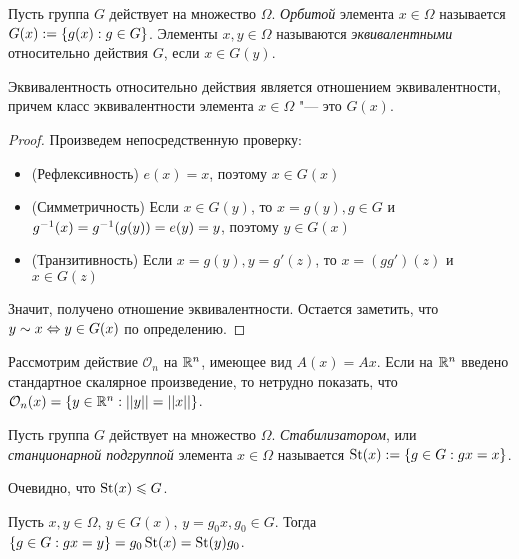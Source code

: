 \begin{definition}
	Пусть группа $G$ действует на множество $\Omega$. \textit{Орбитой} элемента $x \in \Omega$ называется $G(x) := \{g(x): g \hm\in G\}$. Элементы $x, y \in \Omega$ называются \textit{эквивалентными} относительно действия $G$, если $x \in G(y)$.
\end{definition}

\begin{proposition}
	Эквивалентность относительно действия является отношением эквивалентности, причем класс эквивалентности элемента $x \in \Omega$ "--- это $G(x)$.
\end{proposition}

\begin{proof} Произведем непосредственную проверку:
	\begin{itemize}
		\item (Рефлексивность) $e(x) = x$, поэтому $x \in G(x)$
		\item (Симметричность) Если $x \in G(y)$, то $x = g(y), g \in G$ и $g^{-1}(x) \hm= g^{-1}(g(y)) = e(y) = y$, поэтому $y \in G(x)$
		\item (Транзитивность) Если $x = g(y), y = g'(z)$, то $x = (gg')(z)$ и $x \in G(z)$
	\end{itemize}

	Значит, получено отношение эквивалентности. Остается заметить, что $y \sim x \Leftrightarrow y \hm\in G(x)$ по определению.
\end{proof}

\begin{example}
	Рассмотрим действие $\mathcal{O}_n$ на $\mathbb{R}^n$, имеющее вид $A(x) = Ax$. Если на $\mathbb{R}^n$ введено стандартное скалярное произведение, то нетрудно показать, что $\mathcal{O}_n(x) = \{y \in \R^n: ||y|| \hm= ||x||\}$.
\end{example}

\begin{definition}
	Пусть группа $G$ действует на множество $\Omega$. \textit{Стабилизатором}, или \textit{станционарной подгруппой} элемента $x \in \Omega$ называется $\operatorname{St}(x) := \{g \in G: gx = x\}$.
\end{definition}

\begin{note}
	Очевидно, что $\operatorname{St}(x) \leqslant G$.
\end{note}

\begin{proposition}
	Пусть $x, y \in \Omega$, $y \in G(x)$, $y = g_0x, g_0 \in G$. Тогда $\{g \in G: gx = y\} \hm= g_0\St(x) = \St(y)g_0$.
\end{proposition}

